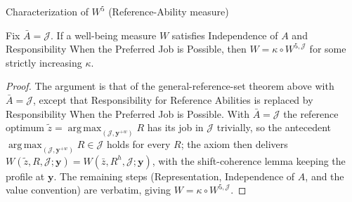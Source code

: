 \documentclass[10pt]{beamer}
\DeclareMathOperator*{\argmax}{arg\,max}
\begin{document}
\begin{frame}[allowframebreaks]{Characterization of $W^5$ (Reference-Ability measure)}
\framebreak

\begin{theorem}[$W^5$, special case $\bar A=\mathcal J$]
Fix $\bar A=\mathcal J$. If a well-being measure $W$ satisfies Independence of
$A$ and Responsibility When the Preferred Job is Possible, then
$W=\kappa\circ W^{5,\mathcal J}$ for some strictly increasing $\kappa$.
\end{theorem}

\begin{proof}
The argument is that of the general-reference-set theorem above with $\bar A=\mathcal J$, except
that Responsibility for Reference Abilities is replaced by Responsibility When
the Preferred Job is Possible. With $\bar A=\mathcal J$ the reference optimum
$\tilde z=\argmax_{(\mathcal J,\mathbf y^{+w})}R$ has its job in $\mathcal J$
trivially, so the antecedent $\argmax_{(\mathcal J,\mathbf y^{+w})}R\in\mathcal
J$ holds for every $R$; the axiom then delivers
$W(\tilde z,R,\mathcal J;\mathbf y)=W(\bar z,R^h,\mathcal J;\mathbf y)$, with
the shift-coherence lemma keeping the profile at $\mathbf y$.
The remaining steps
(Representation, Independence of $A$, and the value
convention) are verbatim, giving $W=\kappa\circ W^{5,\mathcal J}$.
\end{proof}

\medskip
\hyperlink{tab:classification}{}
\end{frame}
\end{document}
